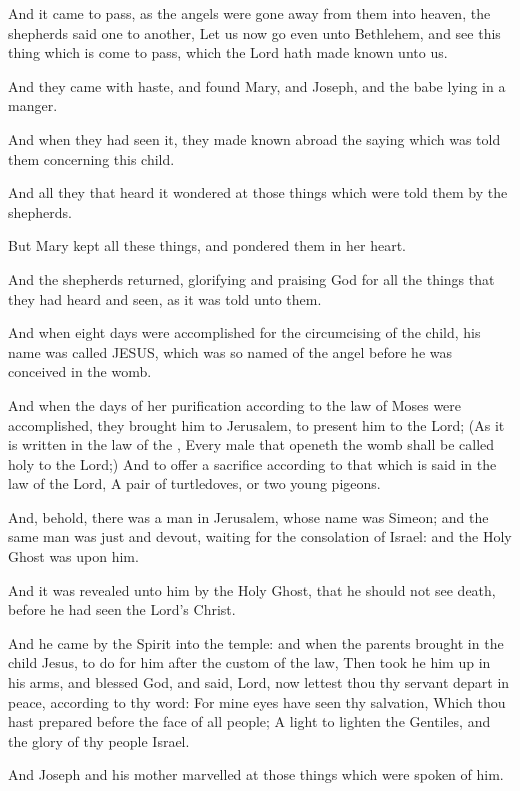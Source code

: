 \verse And it came to pass, as the angels were gone away from them into heaven, the shepherds said one to another, Let us now go even unto Bethlehem, and see this thing which is come to pass, which the Lord hath made known unto us.

\verse And they came with haste, and found Mary, and Joseph, and the babe lying in a manger.

\verse And when they had seen it, they made known abroad the saying which was told them concerning this child.

\verse And all they that heard it wondered at those things which were told them by the shepherds.

\verse But Mary kept all these things, and pondered them in her heart.

\verse And the shepherds returned, glorifying and praising God for all the things that they had heard and seen, as it was told unto them.

\verse And when eight days were accomplished for the circumcising of the child, his name was called JESUS, which was so named of the angel before he was conceived in the womb.

\verse And when the days of her purification according to the law of Moses were accomplished, they brought him to Jerusalem, to present him to the Lord; \verse (As it is written in the law of the \LORD, Every male that openeth the womb shall be called holy to the Lord;) \verse And to offer a sacrifice according to that which is said in the law of the Lord, A pair of turtledoves, or two young pigeons.

\verse And, behold, there was a man in Jerusalem, whose name was Simeon; and the same man was just and devout, waiting for the consolation of Israel: and the Holy Ghost was upon him.

\verse And it was revealed unto him by the Holy Ghost, that he should not see death, before he had seen the Lord's Christ.

\verse And he came by the Spirit into the temple: and when the parents brought in the child Jesus, to do for him after the custom of the law, \verse Then took he him up in his arms, and blessed God, and said, \verse Lord, now lettest thou thy servant depart in peace, according to thy word: \verse For mine eyes have seen thy salvation, \verse Which thou hast prepared before the face of all people; \verse A light to lighten the Gentiles, and the glory of thy people Israel.

\verse And Joseph and his mother marvelled at those things which were spoken of him.

